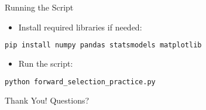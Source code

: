 \documentclass[aspectratio=169]{beamer}
\begin{document}
\begin{frame}[fragile]{Running the Script}
  \begin{itemize}
    \item Install required libraries if needed:
  \end{itemize}
  \vspace{0.5cm}
  \begin{lstlisting}[language=bash]
pip install numpy pandas statsmodels matplotlib
  \end{lstlisting}
  \vspace{0.5cm}
  \begin{itemize}
    \item Run the script:
  \end{itemize}
  \vspace{0.5cm}
  \begin{lstlisting}[language=bash]
python forward_selection_practice.py
  \end{lstlisting}
\end{frame}

\begin{frame}
  \centering
  \Huge Thank You!
  \vspace{1cm}
  \normalsize Questions?
\end{frame}
\end{document}
